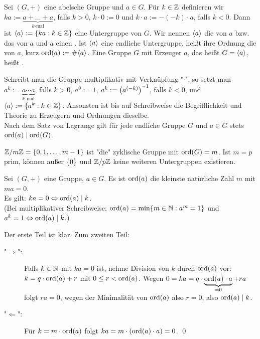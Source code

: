 \begin{defn}
	Sei $(G,+)$ eine abelsche Gruppe und $a \in G$. 
	Für $k \in \mathbb{Z}$ definieren wir $ka := \underbrace{a + \dots + a}_{k\text{-mal}}$, falls $k > 0$, $k \cdot 0 := 0$ und $k \cdot a := -(-k)\cdot a$, falls $k < 0$. 
	Dann ist $\langle a\rangle := \{ka : k \in \mathbb{Z}\}$ eine Untergruppe von $G$. Wir nennen $\langle a\rangle$ die von $a$  bzw. das  von $a$ und $a$ einen . 
	Ist $\langle a\rangle$ eine endliche Untergruppe, heißt ihre Ordnung die  von $a$, kurz $\operatorname{ord}(a) := \#\langle a\rangle$. 
	Eine Gruppe $G$ mit Erzeuger $a$, das heißt $G = \langle a\rangle$, heißt .
\end{defn}

Schreibt man die Gruppe multiplikativ mit Verknüpfung "$\cdot$", so setzt man $a^k := \underbrace{a \cdots a}_{k\text{-mal}}$, falls $k > 0$, $a^0 := 1$, $a^k := \left(a^{(-k)}\right)^{-1}$, falls $k < 0$, und $\langle a\rangle := \{a^k : k \in \mathbb{Z}\}$. 
Ansonsten ist bis auf Schreibweise die Begrifflichkeit und Theorie zu Erzeugern und Ordnungen dieselbe. \\
Nach dem Satz von Lagrange gilt für jede endliche Gruppe $G$ und $a \in G$ stets $\operatorname{ord}(a) \mid \operatorname{ord}(G)$.

\begin{bsp}
	$\mathbb{Z}/m\mathbb{Z} = \{0,1, \dots, m-1\}$ ist "die" zyklische Gruppe mit $\operatorname{ord}(G) = m$. 
	Ist $m = p$ prim, können außer $\{0\}$ und $\mathbb{Z}/p\mathbb{Z}$ keine weiteren Untergruppen existieren.
\end{bsp}

\begin{lemma}
\label{lemma_1.1.3.6}
	Sei $(G,+)$ eine Gruppe, $a \in G$. 
	Es ist $\operatorname{ord}(a)$ die kleinste natürliche Zahl $m$ mit $ma = 0$. \\
	Es gilt: $ka = 0 \Leftrightarrow \operatorname{ord}(a) \mid k$. \\
	(Bei multiplikativer Schreibweise: $\operatorname{ord}(a) = \min\{m \in \mathbb{N} : a^m = 1\}$ und $a^k = 1 \Leftrightarrow \operatorname{ord}(a) \mid k$.)
\end{lemma}

	Der erste Teil ist klar. 
	Zum zweiten Teil:
	\begin{description}
		\item["$\Rightarrow$":] Falls $k \in \mathbb{N}$ mit $ka = 0$ ist, nehme Division von $k$ durch $\operatorname{ord}(a)$ vor: $k = q \cdot \operatorname{ord}(a) + r$ mit $0 \leq r < \operatorname{ord}(a)$. 
		Wegen $0 = ka = q \cdot \underbrace{\operatorname{ord}(a) \cdot a}_{=0} + ra$ folgt $ra = 0$, wegen der Minimalität von $\operatorname{ord}(a)$ also $r=0$, also $\operatorname{ord}(a) \mid k$.
		\item["$\Leftarrow$":] Für $k = m \cdot \operatorname{ord}(a)$ folgt $ka = m \cdot (\operatorname{ord}(a) \cdot a) = 0$. \qed
	\end{description}
	
